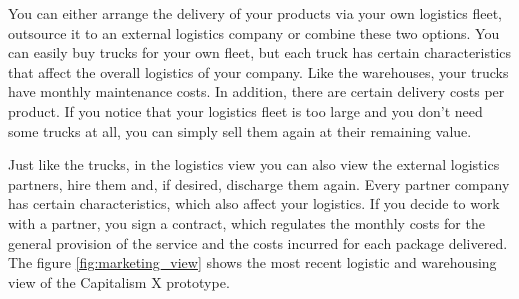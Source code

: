 You can either arrange the delivery of your products via your own logistics fleet, outsource it to an external logistics company or combine these two options. You can easily buy trucks for your own fleet, but each truck has certain characteristics that affect the overall logistics of your company. Like the warehouses, your trucks have monthly maintenance costs. In addition, there are certain delivery costs per product. If you notice that your logistics fleet is too large and you don't need some trucks at all, you can simply sell them again at their remaining value.

Just like the trucks, in the logistics view you can also view the external logistics partners, hire them and, if desired, discharge them again. Every partner company has certain characteristics, which also affect your logistics. If you decide to work with a partner, you sign a contract, which regulates the monthly costs for the general provision of the service and the costs incurred for each package delivered. 
The figure \ref{fig:marketing_view} shows the most recent logistic and warehousing view  of the Capitalism X prototype.